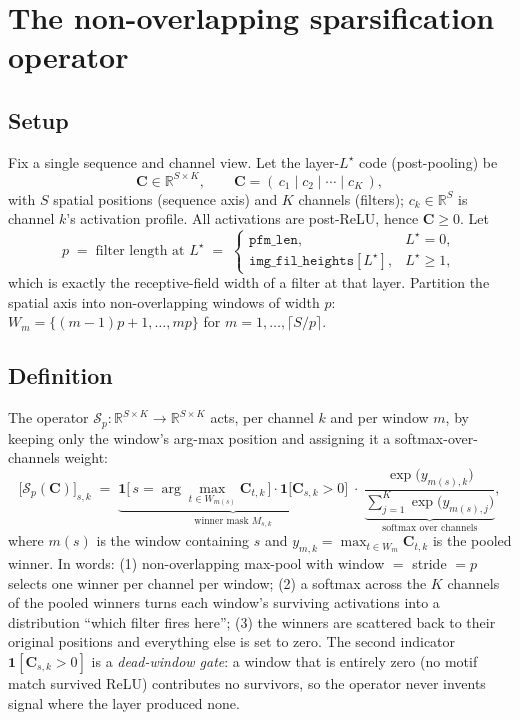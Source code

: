 \documentclass[11pt]{article}
\newcommand{\R}{\mathbb{R}}
\newcommand{\code}{\mathbf{C}}
\begin{document}
\section{The non-overlapping sparsification operator}
\label{sec:op}

\subsection{Setup}
Fix a single sequence and channel view. Let the layer-$L^\star$ code (post-pooling) be
\[
\code \in \R^{S \times K}, \qquad \code = (\,c_1 \mid c_2 \mid \cdots \mid c_K\,),
\]
with $S$ spatial positions (sequence axis) and $K$ channels (filters); $c_k \in \R^S$ is
channel $k$'s activation profile. All activations are post-ReLU, hence $\code \ge 0$. Let
\[
p \;=\; \text{filter length at } L^\star \;=\;
\begin{cases}
\texttt{pfm\_len}, & L^\star = 0,\\[2pt]
\texttt{img\_fil\_heights}[L^\star], & L^\star \ge 1,
\end{cases}
\]
which is exactly the receptive-field width of a filter at that layer. Partition the
spatial axis into non-overlapping windows of width $p$:
$W_m = \{(m-1)p+1,\dots,mp\}$ for $m = 1,\dots,\lceil S/p\rceil$.

\subsection{Definition}
The operator $\mathcal{S}_p : \R^{S\times K}\!\to\R^{S\times K}$ acts, per channel $k$ and
per window $m$, by keeping only the window's arg-max position and assigning it a
softmax-over-channels weight:
\begin{equation}
\label{eq:op}
\big[\mathcal{S}_p(\code)\big]_{s,k} \;=\;
\underbrace{\mathbf{1}\!\big[\,s = \arg\max_{t\in W_{m(s)}} \code_{t,k}\,\big]\cdot
\mathbf{1}\!\big[\code_{s,k} > 0\big]}_{\text{winner mask } M_{s,k}}
\;\cdot\;
\underbrace{\frac{\exp\!\big(y_{m(s),k}\big)}{\sum_{j=1}^{K}\exp\!\big(y_{m(s),j}\big)}}_{\text{softmax over channels}},
\end{equation}
where $m(s)$ is the window containing $s$ and
$y_{m,k} = \max_{t\in W_m}\code_{t,k}$ is the pooled winner. In words: (1) non-overlapping
max-pool with window $=$ stride $=p$ selects one winner per channel per window;
(2) a softmax across the $K$ channels of the pooled winners turns each window's surviving
activations into a distribution ``which filter fires here''; (3) the winners are scattered
back to their original positions and everything else is set to zero. The second indicator
$\mathbf{1}[\code_{s,k}>0]$ is a \emph{dead-window gate}: a window that is entirely zero
(no motif match survived ReLU) contributes no survivors, so the operator never invents
signal where the layer produced none.
\end{document}
